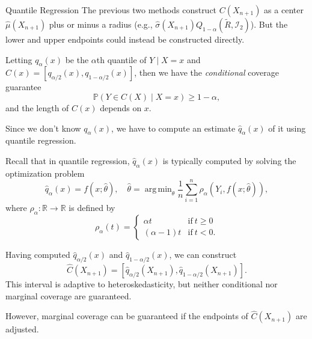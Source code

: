 \documentclass{beamer}
\DeclareMathOperator*{\argmin}{arg\,min}
\newcommand{\Prob}{\mathbb{P}}
\newcommand{\R}{\mathbb{R}}
\begin{document}
\begin{frame}[allowframebreaks]{Quantile Regression}
    The previous two methods construct $C(X_{n + 1})$ as a center $\widehat{\mu}(X_{n + 1})$ plus or minus a radius (e.g., $\widehat{\sigma}(X_{n + 1})Q_{1 - \alpha}(\widetilde{R}, \mathcal{I}_2)$). But the lower and upper endpoints could instead be constructed directly.

    \medskip

    Letting $q_{\alpha}(x)$ be the $\alpha$th quantile of $Y \mid X = x$ and $C(x) = [q_{\alpha / 2}(x), q_{1 - \alpha / 2}(x)]$, then we have the \emph{conditional} coverage guarantee
    \[
    \Prob(Y \in C(X) \mid X = x) \ge 1 - \alpha,
    \]
    and the length of $C(x)$ depends on $x$.

    \medskip

    Since we don't know $q_{\alpha}(x)$, we have to compute an estimate $\widehat{q}_{\alpha}(x)$ of it using quantile regression.

    \framebreak

    Recall that in quantile regression, $\widehat{q}_{\alpha}(x)$ is typically computed by solving the optimization problem
    \[
    \widehat{q}_{\alpha}(x) = f(x; \widehat{\theta}), \quad \widehat{\theta} = \argmin_{\theta} \frac{1}{n}\sum_{i = 1}^n \rho_{\alpha}(Y_i, f(x; \widehat{\theta})),
    \]
    where $\rho_{\alpha} : \R \to \R$ is defined by
    \[
    \rho_{\alpha}(t)
    =
    \begin{cases}
        \alpha t & \text{if} \ t \ge 0 \\
        (\alpha - 1)t & \text{if} \ t < 0.
    \end{cases}
    \]

    \framebreak

    Having computed $\widehat{q}_{\alpha / 2}(x)$ and $\widehat{q}_{1 - \alpha / 2}(x)$, we can construct
    \[
    \widehat{C}(X_{n + 1}) = [\widehat{q}_{\alpha / 2}(X_{n + 1}), \widehat{q}_{1 - \alpha / 2}(X_{n + 1})].
    \]
    This interval is adaptive to heteroskedasticity, but neither conditional nor marginal coverage are guaranteed.

    \medskip

    However, marginal coverage can be guaranteed if the endpoints of $\widehat{C}(X_{n + 1})$ are adjusted.
\end{frame}
\end{document}
